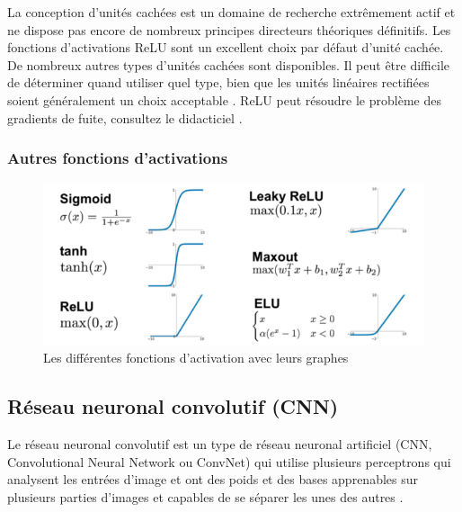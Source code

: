 	La conception d'unités cachées est un domaine de recherche extrêmement actif et ne dispose pas encore de nombreux principes directeurs théoriques définitifs.
	Les fonctions d'activations ReLU sont un excellent choix par défaut d'unité cachée.\\De nombreux autres types d'unités cachées sont disponibles. Il peut être diﬃcile de déterminer quand utiliser quel type, bien que les unités linéaires rectiﬁées soient généralement un choix acceptable \cite{goodfellow2016deep}. ReLU peut résoudre le problème des gradients de fuite, consultez le didacticiel \cite{pretorius2018critical}.
	
	\subsubsection{Autres fonctions d'activations}
	
	\begin{figure}[H]%
		\centering
		\includegraphics[width=12cm]{images/activation_functions.png}
		\caption{Les différentes fonctions d'activation avec leurs graphes}
		\label{fig:all_activation_function}
	\end{figure}
	
	
	
	\subsection{Réseau neuronal convolutif (CNN)}\label{sec:cnn}
	
	Le réseau neuronal convolutif est un type de réseau neuronal artificiel (CNN, Convolutional Neural Network ou ConvNet) qui utilise plusieurs perceptrons qui analysent les entrées d'image et ont des poids et des bases apprenables sur plusieurs parties d'images et capables de se séparer les unes des autres \cite{tammina2019transfer}.
	
